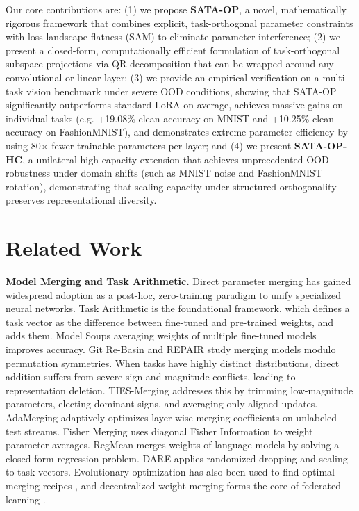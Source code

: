 \documentclass{article}
\theoremstyle{plain}
\theoremstyle{definition}
\theoremstyle{remark}
\begin{document}
Our core contributions are: (1) we propose \textbf{SATA-OP}, a novel, mathematically rigorous framework that combines explicit, task-orthogonal parameter constraints with loss landscape flatness (SAM) to eliminate parameter interference; (2) we present a closed-form, computationally efficient formulation of task-orthogonal subspace projections via QR decomposition that can be wrapped around any convolutional or linear layer; (3) we provide an empirical verification on a multi-task vision benchmark under severe OOD conditions, showing that SATA-OP significantly outperforms standard LoRA on average, achieves massive gains on individual tasks (e.g. +19.08\% clean accuracy on MNIST and +10.25\% clean accuracy on FashionMNIST), and demonstrates extreme parameter efficiency by using 80$\times$ fewer trainable parameters per layer; and (4) we present \textbf{SATA-OP-HC}, a unilateral high-capacity extension that achieves unprecedented OOD robustness under domain shifts (such as MNIST noise and FashionMNIST rotation), demonstrating that scaling capacity under structured orthogonality preserves representational diversity.

\section{Related Work}
\label{sec:related}

\textbf{Model Merging and Task Arithmetic.} Direct parameter merging has gained widespread adoption as a post-hoc, zero-training paradigm to unify specialized neural networks. Task Arithmetic \cite{task_arithmetic} is the foundational framework, which defines a task vector as the difference between fine-tuned and pre-trained weights, and adds them. Model Soups \cite{wortsman2022model} averaging weights of multiple fine-tuned models improves accuracy. Git Re-Basin \cite{ainsworth2023git} and REPAIR \cite{jordan2023repair} study merging models modulo permutation symmetries. When tasks have highly distinct distributions, direct addition suffers from severe sign and magnitude conflicts, leading to representation deletion. TIES-Merging \cite{ties} addresses this by trimming low-magnitude parameters, electing dominant signs, and averaging only aligned updates. AdaMerging \cite{adamerging} adaptively optimizes layer-wise merging coefficients on unlabeled test streams. Fisher Merging \cite{matena2022merging} uses diagonal Fisher Information to weight parameter averages. RegMean \cite{jin2023dataless} merges weights of language models by solving a closed-form regression problem. DARE \cite{yu2024language} applies randomized dropping and scaling to task vectors. Evolutionary optimization has also been used to find optimal merging recipes \cite{akiba2024evolutionary}, and decentralized weight merging forms the core of federated learning \cite{mcmahan2017communication}.
\end{document}

